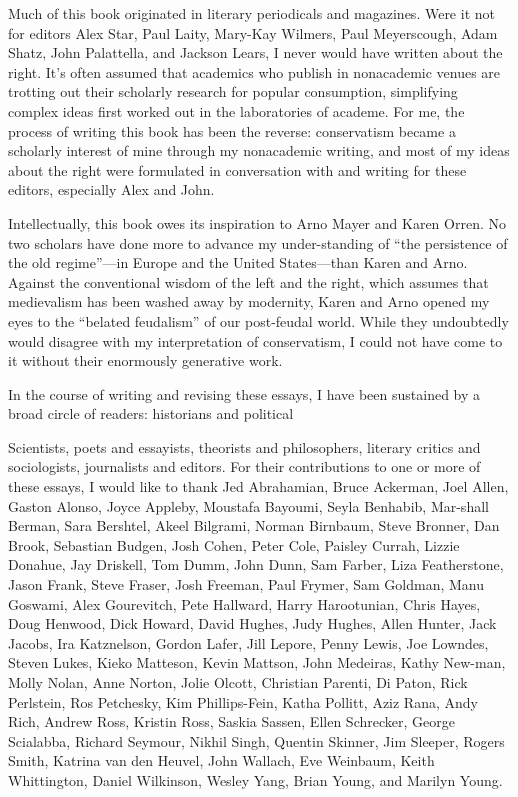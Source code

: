 Much of this book originated in literary periodicals and magazines. Were it not for editors Alex Star, Paul Laity, Mary-Kay Wilmers, Paul Meyerscough, Adam Shatz, John Palattella, and Jackson Lears, I never would have written about the right. It’s often assumed that academics who publish in nonacademic venues are trotting out their scholarly research for popular consumption, simplifying complex ideas first worked out in the laboratories of academe. For me, the process of writing this book has been the reverse: conservatism became a scholarly interest of mine through my nonacademic writing, and most of my ideas about the right were formulated in conversation with and writing for these editors, especially Alex and John.
 \par 
Intellectually, this book owes its inspiration to Arno Mayer and Karen Orren. No two scholars have done more to advance my under-standing of “the persistence of the old regime”—in Europe and the United States—than Karen and Arno. Against the conventional wisdom of the left and the right, which assumes that medievalism has been washed away by modernity, Karen and Arno opened my eyes to the “belated feudalism” of our post-feudal world. While they undoubtedly would disagree with my interpretation of conservatism, I could not have come to it without their enormously generative work.
 \par 
In the course of writing and revising these essays, I have been sustained by a broad circle of readers: historians and political
 \par 
Scientists, poets and essayists, theorists and philosophers, literary critics and sociologists, journalists and editors. For their contributions to one or more of these essays, I would like to thank Jed Abrahamian, Bruce Ackerman, Joel Allen, Gaston Alonso, Joyce Appleby, Moustafa Bayoumi, Seyla Benhabib, Mar-shall Berman, Sara Bershtel, Akeel Bilgrami, Norman Birnbaum, Steve Bronner, Dan Brook, Sebastian Budgen, Josh Cohen, Peter Cole, Paisley Currah, Lizzie Donahue, Jay Driskell, Tom Dumm, John Dunn, Sam Farber, Liza Featherstone, Jason Frank, Steve Fraser, Josh Freeman, Paul Frymer, Sam Goldman, Manu Goswami, Alex Gourevitch, Pete Hallward, Harry Harootunian, Chris Hayes, Doug Henwood, Dick Howard, David Hughes, Judy Hughes, Allen Hunter, Jack Jacobs, Ira Katznelson, Gordon Lafer, Jill Lepore, Penny Lewis, Joe Lowndes, Steven Lukes, Kieko Matteson, Kevin Mattson, John Medeiras, Kathy New-man, Molly Nolan, Anne Norton, Jolie Olcott, Christian Parenti, Di Paton, Rick Perlstein, Ros Petchesky, Kim Phillips-Fein, Katha Pollitt, Aziz Rana, Andy Rich, Andrew Ross, Kristin Ross, Saskia Sassen, Ellen Schrecker, George Scialabba, Richard Seymour, Nikhil Singh, Quentin Skinner, Jim Sleeper, Rogers Smith, Katrina van den Heuvel, John Wallach, Eve Weinbaum, Keith Whittington, Daniel Wilkinson, Wesley Yang, Brian Young, and Marilyn Young.
